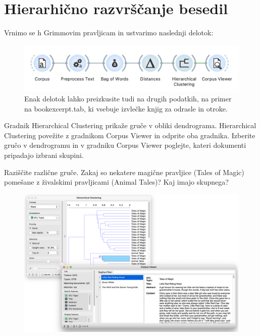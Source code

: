 \chapter{Hierarhično razvrščanje besedil}
\label{ch:hierarhicno-razvrscanje-besedil}

Vrnimo se h Grimmovim pravljicam in ustvarimo naslednji delotok:

\begin{figure}[h]
    \centering
    \includegraphics[width=\linewidth]{hc-workflow.png}%
    \caption{Enak delotok lahko preizkusite tudi na drugih podatkih, na primer na bookexcerpt.tab, ki vsebuje izvlečke knjig za odrasle in otroke.}
    \label{fig:005-hc-workflow}
  \end{figure}

Gradnik Hierarchical Clustering prikaže gruče v obliki dendrograma. Hierarchical Clustering povežite z gradnikom Corpus Viewer in odprite oba gradnika. Izberite gručo v dendrogramu in v gradniku Corpus Viewer poglejte, kateri dokumenti pripadajo izbrani skupini.

Raziščite različne gruče. Zakaj so nekatere magične pravljice (Tales of Magic) pomešane z živalskimi pravljicami (Animal Tales)? Kaj imajo skupnega?

\begin{figure}[h]
    \includegraphics[width=\linewidth]{hc-one-cluster.png}%
    \caption{ }
    \label{fig:005-hc-one-cluster}
\end{figure}

